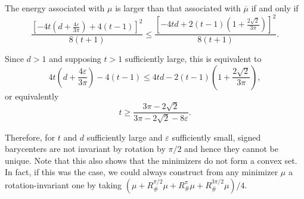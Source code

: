 \documentclass[12pt]{amsart}
\numberwithin{equation}{section}
\theoremstyle{plain}
\theoremstyle{definition}
\begin{document}
The energy associated with $\mu$ is larger than that associated with 
$\overline{\mu}$ if and only if
\[
\frac{
\left[
-4t\left(d+\frac{4\varepsilon}{3\pi}\right)
+4(t-1)
\right]^2
}{8(t+1)}
\leq
\frac{
\left[
-4td+
2(t-1)\left(1+\frac{2\sqrt2}{3\pi}\right)
\right]^2
}{8(t+1)}.
\]

Since $d>1$ and supposing $t>1$ sufficiently large, this is equivalent to
\[
4t\left(d+\frac{4\varepsilon}{3\pi}\right)-4(t-1)
\leq
4td
-
2(t-1)\left(1+\frac{2\sqrt2}{3\pi}\right),
\]
or equivalently
\[
t\geq
\frac{3\pi-2\sqrt2}
{3\pi-2\sqrt2-8\varepsilon}.
\]

Therefore, for $t$ and $d$ sufficiently large and $\varepsilon$ sufficiently small, signed barycenters are not invariant by 
rotation by $\pi/2$ and hence they cannot be unique.
Note that this also shows that the minimizers do not form a convex set. In fact, if this was the case, we could always construct from any minimizer $\mu$ a rotation-invariant one by taking $(\mu + R^{\pi/2}_\# \mu+ R^{\pi}_\# \mu + R^{3\pi/2}_\# \mu)/4$.

   
\end{document}
